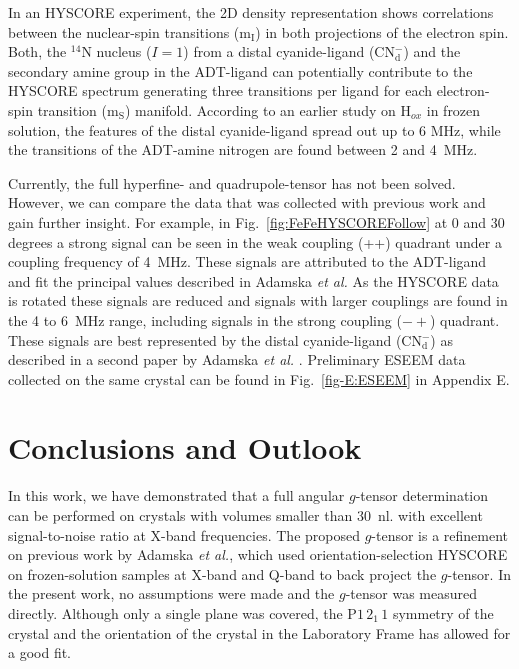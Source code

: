 In an HYSCORE experiment, the 2D density representation shows correlations between the nuclear-spin transitions (m$_\text{I}$) in both projections of the electron spin. Both, the $^{14}$N nucleus ($I=1$) from a distal cyanide-ligand (CN$_\text{d}^-$) and the secondary amine group in the ADT-ligand can potentially contribute to the HYSCORE spectrum generating three transitions per ligand for each electron-spin transition (m$_\text{S}$) manifold. According to an earlier study on H$_{ox}$ in frozen solution, the features of the distal cyanide-ligand spread out up to 6 MHz, while the transitions of the ADT-amine nitrogen are found between 2 and 4~MHz. \cite{Adamska2015,Adamska2015pdt}

Currently, the full hyperfine- and quadrupole-tensor has not been solved. However, we can compare the data that was collected with previous work and gain further insight. For example, in Fig.~\ref{fig:FeFeHYSCOREFollow} at 0 and 30 degrees a strong signal can be seen in the weak coupling (++) quadrant under a coupling frequency of 4~MHz. These signals are attributed to the ADT-ligand and fit the principal values described in Adamska \textit{ et al.} \cite{Adamska2015pdt} As the HYSCORE data is rotated these signals are reduced and signals with larger couplings are found in the 4 to 6~MHz range, including signals in the strong coupling ($-+$) quadrant. These signals are best represented by the distal cyanide-ligand (CN$_\text{d}^-$) as described in a second paper by Adamska\textit{ et al.} \cite{Adamska2015}. Preliminary ESEEM data collected on the same crystal can be found in Fig.~\ref{fig-E:ESEEM} in Appendix E.

\section{Conclusions and Outlook}
In this work, we have demonstrated that a full angular $g$-tensor determination can be performed on crystals with volumes smaller than 30~nl. with excellent signal-to-noise ratio at X-band frequencies. The proposed $g$-tensor is a refinement on previous work by Adamska \textit{et al.}, which used orientation-selection HYSCORE on frozen-solution samples at X-band and Q-band to back project the $g$-tensor. In the present work, no assumptions were made and the $g$-tensor was measured directly. Although only a single plane was covered, the P$1\,2_1\,1$ symmetry of the crystal and the orientation of the crystal in the Laboratory Frame has allowed for a good fit. 

